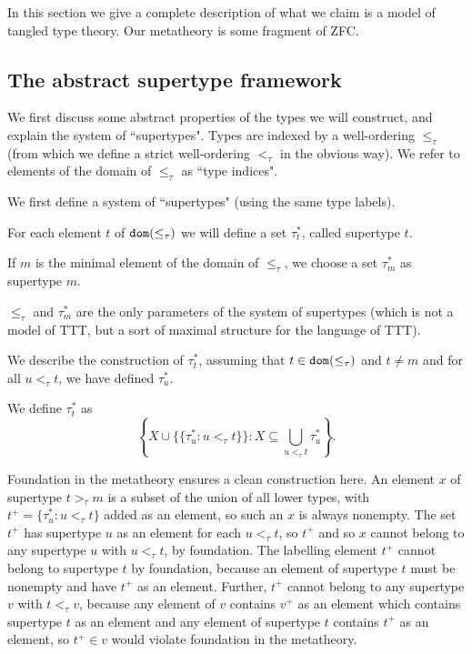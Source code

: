 \documentclass{article}
\theoremstyle{definition}
\theoremstyle{remark}
\begin{document}
{In this section we give a complete description of what we claim is a model of tangled type theory.  Our metatheory is some fragment of ZFC.

\subsection{The abstract supertype framework}
\label{ss:supertype_framework}


We first discuss some abstract properties of the types we will construct, and explain the system of ``supertypes".
Types are indexed by a well-ordering $\leq_\tau$ (from which we define a strict well-ordering $<_\tau$ in the obvious way).
We refer to elements of the domain of $\leq_\tau$ as ``type indices".

We first define a system of ``supertypes" (using the same type labels).

For each element $t$ of ${\tt dom}(\leq_\tau)$ we will define a set $\tau^*_t$, called supertype $t$.

If $m$ is the minimal element of the domain of $\leq_\tau$, we choose a set $\tau^*_m$ as supertype $m$.

$\leq_\tau$ and $\tau^*_m$ are the only parameters of the system of supertypes (which is not a model of TTT, but a sort of maximal structure for the language of TTT).

We describe the construction of $\tau^*_t$, assuming that $t \in {\tt dom}(\leq_\tau)$ and $t \neq m$ and for all $u <_\tau t$, we have
defined $\tau^*_u$.

We define $\tau^*_t$ as $$\left\{X \cup \{\{\tau^*_u:u <_\tau t\}\}:X \subseteq \bigcup_{u <_\tau t}\tau^*_u\right\}.$$


Foundation in the metatheory ensures a clean construction here.
An element $x$ of supertype $t>_\tau m$ is a subset of the union of all lower types, with $t^+ = \{\tau^*_u:u <_\tau t\}$ added as an element, so such an $x$ is always nonempty.
The set $t^+$ has supertype $u$ as an element for each $u <_\tau t$, so $t^+$ and so $x$  cannot belong to any supertype $u$ with $u <_\tau t$, by foundation.  The labelling element $t^+$ cannot belong to supertype $t$ by foundation, because an element of supertype $t$ must be nonempty and have $t^+$ as an element.  Further, $t^+$ cannot belong to any supertype $v$ with $t <_\tau v$, because any element of $v$ contains $v^+$ as an element which contains supertype $t$ as an element and any element of supertype $t$ contains $t^+$ as an element, so $t^+ \in v$ would violate foundation in the metatheory.

}
\end{document}
